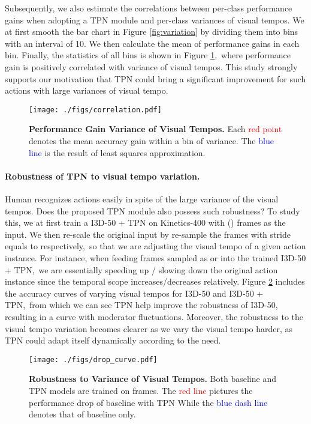 \documentclass[10pt,twocolumn,letterpaper]{article}
\begin{document}
Subsequently, we also estimate the correlations between per-class performance gains when adopting a TPN module and per-class variances of visual tempos.
We at first smooth the bar chart in Figure \ref{fig:variation} by dividing them into bins with an interval of 10.
We then calculate the mean of performance gains in each bin.
Finally, the statistics of all bins is shown in Figure \ref{fig:correlation},\
where performance gain is positively correlated with variance of visual tempos.
This study strongly supports our motivation that TPN could bring a significant improvement for such actions with large variances of visual tempo.


\begin{figure}[t]
    \centering
    \texttt{[image: ./figs/correlation.pdf]}
    \caption{
        \textbf{Performance Gain \vs Variance of Visual Tempos.}
        Each \textcolor{red}{red point} denotes the mean accuracy gain within a bin of variance.
        The \textcolor{blue}{blue line} is the result of least squares approximation. 
    }
    \label{fig:correlation}
\end{figure}


\paragraph{Robustness of TPN to visual tempo variation.}

Human recognizes actions easily in spite of the large variance of the visual tempos.
Does the proposed TPN module also possess such robustness?
To study this, we at first train a I3D-50 + TPN on Kinetics-400 \cite{kinetics} with  () frames as the input.
We then re-scale the original  input by re-sample the frames with stride  equals to  respectively,\
so that we are adjusting the visual tempo of a given action instance.
For instance, when feeding frames sampled as  or  into the trained I3D-50 + TPN,\
we are essentially speeding up / slowing down the original action instance since the temporal scope increases/decreases relatively.
Figure \ref{fig:drop_curve} includes the accuracy curves of varying visual tempos for I3D-50 and I3D-50 + TPN,\
from which we can see TPN help improve the robustness of I3D-50, resulting in a curve with moderator fluctuations.
Moreover, the robustness to the visual tempo variation becomes clearer as we vary the visual tempo harder, as TPN could adapt itself dynamically according to the need.


\begin{figure}[t]
    \centering
    \texttt{[image: ./figs/drop\_curve.pdf]}
    \caption{
        \textbf{Robustness to Variance of Visual Tempos.}
        Both baseline and TPN models are trained on  frames.
        The \textcolor{red}{red line} pictures the performance drop of baseline with TPN While the \textcolor{blue}{blue dash line} denotes that of baseline only.
    }
    \label{fig:drop_curve}
\end{figure}
\end{document}
